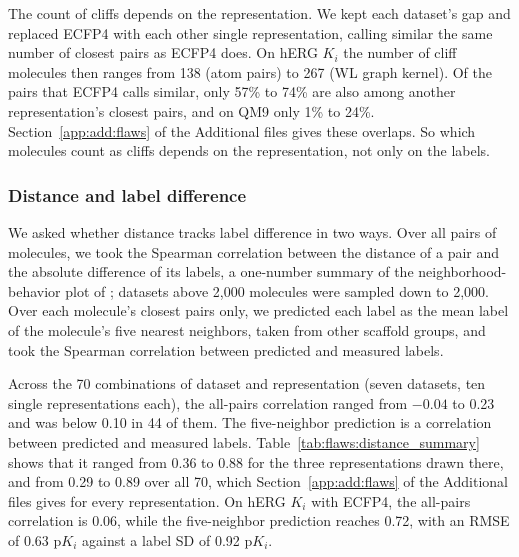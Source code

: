 The count of cliffs depends on the representation. We kept each dataset's gap and replaced ECFP4 with each other single representation, calling similar the same number of closest pairs as ECFP4 does. On hERG $K_i$ the number of cliff molecules then ranges from 138 (atom pairs) to 267 (WL graph kernel). Of the pairs that ECFP4 calls similar, only 57\% to 74\% are also among another representation's closest pairs, and on QM9 only 1\% to 24\%. Section~\ref{app:add:flaws} of the Additional files gives these overlaps. So which molecules count as cliffs depends on the representation, not only on the labels.

\subsubsection{Distance and label difference}
We asked whether distance tracks label difference in two ways. Over all pairs of molecules, we took the Spearman correlation between the distance of a pair and the absolute difference of its labels, a one-number summary of the neighborhood-behavior plot of \citet{Patterson1996}; datasets above 2,000 molecules were sampled down to 2,000. Over each molecule's closest pairs only, we predicted each label as the mean label of the molecule's five nearest neighbors, taken from other scaffold groups, and took the Spearman correlation between predicted and measured labels.

Across the 70 combinations of dataset and representation (seven datasets, ten single representations each), the all-pairs correlation ranged from $-0.04$ to 0.23 and was below 0.10 in 44 of them. The five-neighbor prediction is a correlation between predicted and measured labels. Table~\ref{tab:flaws:distance_summary} shows that it ranged from 0.36 to 0.88 for the three representations drawn there, and from 0.29 to 0.89 over all 70, which Section~\ref{app:add:flaws} of the Additional files gives for every representation. On hERG $K_i$ with ECFP4, the all-pairs correlation is 0.06, while the five-neighbor prediction reaches 0.72, with an RMSE of 0.63 p$K_i$ against a label SD of 0.92 p$K_i$.

